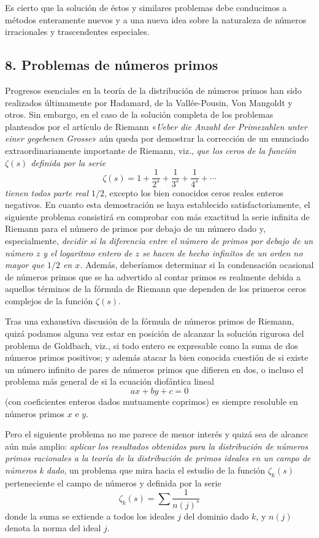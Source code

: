 \documentclass[a4paper, 12pt]{article}
\begin{document}
Es cierto que la solución de éstos y similares problemas debe conducimos a métodos enteramente nuevos y a una nueva idea sobre la naturaleza de números irracionales y trascendentes especiales. 

\subsection*{8. Problemas de números primos }

Progresos esenciales en la teoría de la distribución de números primos han sido realizados últimamente por Hadamard, de la Vallée-Pousin, Von Mangoldt y otros. Sin embargo, en el caso de la solución completa de los problemas planteados por el artículo de Riemann «\textit{Ueber die Anzahl der Primezahlen unter einer gegebenen Grosse}» aún queda por demostrar la corrección de un enunciado extraordinariamente importante de Riemann, viz., \textit{que los ceros de la función $\zeta(s)$  definida por la serie
$$
\zeta(s)= 1+ \frac{1}{2^s}+\frac{1}{3^s}+\frac{1}{4^s}+ \cdots
$$ 
tienen todos parte real $1/2$}, excepto los bien conocidos ceros reales enteros negativos. En cuanto esta demostración se haya establecido satisfactoriamente, el siguiente problema consistirá en comprobar con más exactitud la serie infinita de Riemann para el número de primos por debajo de un número dado y, especialmente, \textit{decidir si la diferencia entre el número de primos por debajo de un número $z$ y el logaritmo entero de $z$ se hacen de hecho infinitos de un orden no mayor que $1/2$ en $x$.}   Además, deberíamos determinar si la condensación ocasional de números primos que se ha advertido al contar primos es realmente debida a aquellos términos de la fórmula de Riemann que dependen de los primeros ceros complejos de la función $\zeta(s)$. 
   
   
Tras una exhaustiva discusión de la fórmula de números primos de Riemann, quizá podamos alguna vez estar en posición de alcanzar la solución rigurosa del problema de Goldbach, viz., si todo entero es expresable como la suma de dos números primos positivos; y además atacar la bien conocida cuestión de si existe un número infinito de pares de números primos que difieren en dos, o incluso el problema más general de si la ecuación diofántica lineal
$$
ax+by+c=0
$$
(con coeficientes enteros dados mutuamente coprimos) es siempre resoluble en números primos $x$ e $y$.

Pero el siguiente problema no me parece de menor interés y quizá sea de alcance aún más amplio: \textit{aplicar los resultados obtenidos para la distribución de números primos racionales a la teoría de la distribución de primos ideales en un campo de números k dado}, un problema que mira hacia el estudio de la función $\zeta_k(s)$ perteneciente el campo de números y definida por la serie
$$
\zeta_k(s)= \sum \frac{1}{n(j)^s}
$$
donde la suma se extiende a todos los ideales $j$ del dominio dado $k$, y $n(j)$ denota la norma del ideal $j$.
\end{document}
